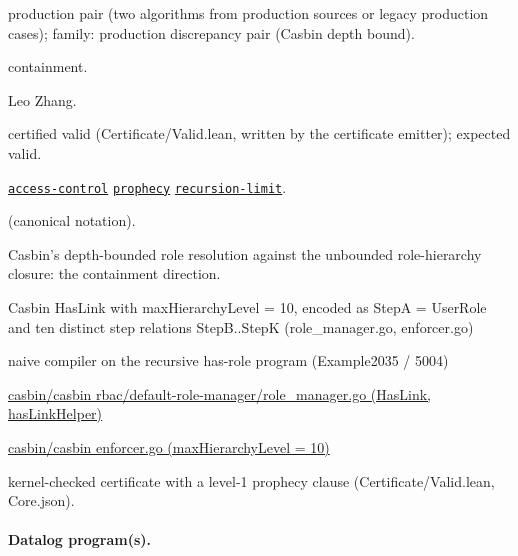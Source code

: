 \documentclass[10pt]{article}
\begin{document}
\begin{description}[leftmargin=2.6cm,style=nextline,itemsep=1pt]

\item[Category] production pair (two algorithms from production sources or legacy production cases); family: production discrepancy pair (Casbin depth bound).

\item[Kind] containment.

\item[Contributors] Leo Zhang.

\item[Status] certified valid (Certificate/Valid.lean, written by the certificate emitter); expected valid.

\item[Tags] \hyperref[tag:access-control]{\texttt{access-control}} \hyperref[tag:prophecy]{\texttt{prophecy}} \hyperref[tag:recursion-limit]{\texttt{recursion-limit}}.

\item[Input]  (canonical notation).

\item[Summary] Casbin's depth-bounded role resolution against the unbounded role-hierarchy closure: the containment direction.

\item[Sides] Casbin HasLink with maxHierarchyLevel = 10, encoded as StepA = UserRole and ten distinct step relations StepB..StepK (role\_manager.go, enforcer.go) \par naive compiler on the recursive has-role program (Example2035 / 5004)

\item[Sources] {\raggedright \href{https://github.com/casbin/casbin/blob/master/rbac/default-role-manager/role_manager.go}{casbin/casbin rbac/default-role-manager/role\_manager.go (HasLink, hasLinkHelper)} \par \href{https://github.com/casbin/casbin/blob/master/enforcer.go}{casbin/casbin enforcer.go (maxHierarchyLevel = 10)}\par}

\item[Prophecy] kernel-checked certificate with a level-1 prophecy clause (Certificate/Valid.lean, Core.json).

\end{description}

\paragraph{Datalog program(s).}
\end{document}
